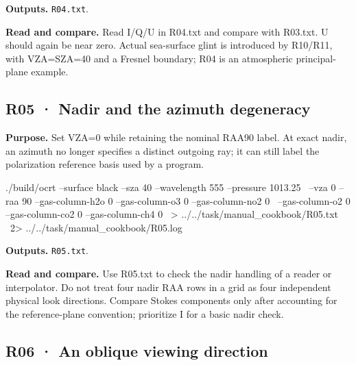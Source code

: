 \textbf{Outputs. }\texttt{R04.txt}.

\textbf{Read and compare. }Read I/Q/U in R04.txt and compare with R03.txt. U should again be near zero. Actual sea-surface glint is introduced by R10/R11, with VZA=SZA=40\textdegree{} and a Fresnel boundary; R04 is an atmospheric principal-plane example.


\subsection{R05 · Nadir and the azimuth degeneracy}
\label{sec:auto:09_cookbook:2.5}

\label{recipe:R05}

\textbf{Purpose. }Set VZA=0\textdegree{} while retaining the nominal RAA90\textdegree{} label. At exact nadir, an azimuth no longer specifies a distinct outgoing ray; it can still label the polarization reference basis used by a program.

\noindent\begin{minipage}{\linewidth}
\begin{ManualCode}

./build/ocrt --surface black --sza 40 --wavelength 555 --pressure 1013.25 \
  --vza 0 --raa 90 --gas-column-h2o 0 --gas-column-o3 0 --gas-column-no2 0 \
  --gas-column-o2 0 --gas-column-co2 0 --gas-column-ch4 0 \
  > ../../task/manual_cookbook/R05.txt \
  2> ../../task/manual_cookbook/R05.log

\end{ManualCode}
\end{minipage}\par

\textbf{Outputs. }\texttt{R05.txt}.

\textbf{Read and compare. }Use R05.txt to check the nadir handling of a reader or interpolator. Do not treat four nadir RAA rows in a grid as four independent physical look directions. Compare Stokes components only after accounting for the reference-plane convention; prioritize I for a basic nadir check.

\Needspace{17\baselineskip}

\subsection{R06 · An oblique viewing direction}
\label{sec:auto:09_cookbook:2.6}

\label{recipe:R06}

